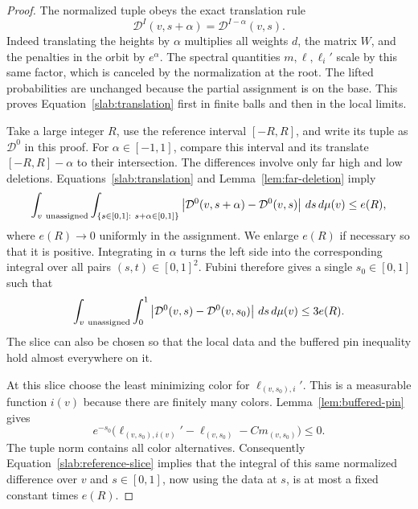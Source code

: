 \begin{proof}
The normalized tuple obeys the exact translation rule
\begin{equation}
 \mathcal D^I(v,s+\alpha)=\mathcal D^{I-\alpha}(v,s).
 \label{slab:translation}
\end{equation}
Indeed translating the heights by $\alpha$ multiplies all weights
$d$, the matrix $W$, and the penalties in the orbit by $e^\alpha$.
The spectral quantities $m,\ell,\ell_i'$ scale by this same factor,
which is canceled by the normalization at the root. The lifted
probabilities are unchanged because the partial assignment is on the
base. This proves Equation~\eqref{slab:translation} first in finite
balls and then in the local limits.

Take a large integer $R$, use the reference interval $[-R,R]$, and
write its tuple as $\mathcal D^0$ in this proof. For
$\alpha\in[-1,1]$, compare this interval and its translate
$[-R,R]-\alpha$ to their intersection. The differences involve only
far high and low deletions. Equations~\eqref{slab:translation} and
Lemma~\ref{lem:far-deletion} imply
\begin{equation}
 \int_{v\ \mathrm{unassigned}}
 \int_{\{s\in[0,1]:\ s+\alpha\in[0,1]\}}
 \left|\mathcal D^0(v,s+\alpha)-\mathcal D^0(v,s)\right|
 \,ds\,d\mu(v)\leq e(R),
 \label{slab:small-translation}
\end{equation}
where $e(R)\to0$ uniformly in the assignment. We enlarge $e(R)$ if
necessary so that it is positive. Integrating in $\alpha$ turns the
left side into the corresponding integral over all pairs
$(s,t)\in[0,1]^2$. Fubini therefore gives a single $s_0\in[0,1]$
such that
\begin{equation}
 \int_{v\ \mathrm{unassigned}}\int_0^1
 \abs{\mathcal D^0(v,s)-\mathcal D^0(v,s_0)}
 \,ds\,d\mu(v)\leq3e(R).
 \label{slab:reference-slice}
\end{equation}
The slice can also be chosen so that the local data and the buffered
pin inequality hold almost everywhere on it.

At this slice choose the least minimizing color for
$\ell_{(v,s_0),i}'$. This is a measurable function $i(v)$ because there
are finitely many colors. Lemma~\ref{lem:buffered-pin} gives
\[
 e^{-s_0}\bigl(\ell_{(v,s_0),i(v)}'-\ell_{(v,s_0)}
                         -Cm_{(v,s_0)}\bigr)\leq0.
\]
The tuple norm contains all color alternatives. Consequently
Equation~\eqref{slab:reference-slice} implies that the integral of
this same normalized difference over $v$ and $s\in[0,1]$, now using
the data at $s$, is at most a fixed constant times $e(R)$.


\end{proof}

